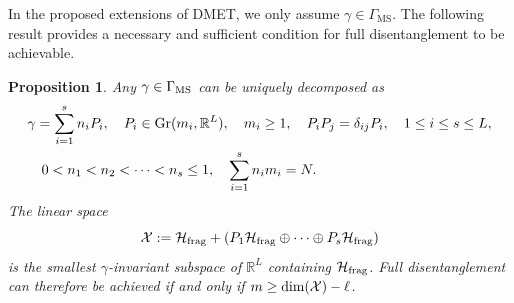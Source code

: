 \documentclass{article}
\def\R{\mathbb R}
\newtheorem{proposition}[theorem]{Proposition}
\newcommand{\1}{{\mathds 1}}
\begin{document}
\medskip

In the proposed extensions of DMET, we only assume $\gamma \in \Gamma_{\mathrm{MS}}$. The following result provides a necessary and sufficient condition for full disentanglement to be achievable.



\begin{proposition}
    Any $\gamma \in \Gamma_{\rm MS}$ can be uniquely decomposed as
    \begin{equation}\label{eq:decompD}
    \begin{split}
         & \gamma =  \sum_{i=1}^s n_i P_i, \quad P_i \in {\rm Gr}(m_i,\R^L), \quad m_i \ge 1, \quad P_iP_j=\delta_{ij}P_i, \quad 1 \le i \le s \le L,\\ 
         &\quad 0 <  n_1 < n_2 < \cdots < n_s \le 1,
          \quad  \sum_{i=1}^s n_im_i=N.     
    \end{split}
    \end{equation}
    The linear space
        $$
    \mathcal X:=\mathcal{H}_{\rm frag} + \left( P_1 \mathcal{H}_{\rm frag} \oplus \cdots \oplus P_s \mathcal{H}_{\rm frag} \right) 
    $$
    is the smallest $\gamma$-invariant subspace of $\R^L$ containing $\mathcal{H}_{\rm frag}$.
    Full disentanglement can therefore be achieved if and only if $m \ge {\rm dim}(\mathcal X)-\ell$.
\end{proposition}
\end{document}
